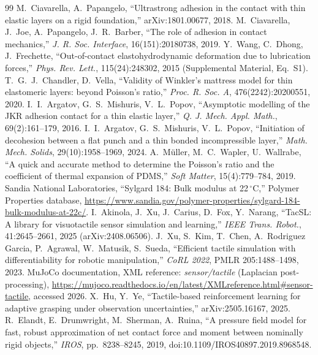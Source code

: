 \documentclass[10pt,twocolumn]{article}
\begin{document}
{\begin{thebibliography}{99}
 M.~Ciavarella, A.~Papangelo, ``Ultrastrong adhesion in the contact with thin elastic layers on a rigid foundation,'' arXiv:1801.00677, 2018.
 M.~Ciavarella, J.~Joe, A.~Papangelo, J.~R.~Barber, ``The role of adhesion in contact mechanics,'' \emph{J. R. Soc. Interface}, 16(151):20180738, 2019.
 Y.~Wang, C.~Dhong, J.~Frechette, ``Out-of-contact elastohydrodynamic deformation due to lubrication forces,'' \emph{Phys. Rev. Lett.}, 115(24):248302, 2015 (Supplemental Material, Eq.~S1).
 T.~G.~J.~Chandler, D.~Vella, ``Validity of Winkler's mattress model for thin elastomeric layers: beyond Poisson's ratio,'' \emph{Proc. R. Soc. A}, 476(2242):20200551, 2020.
 I.~I.~Argatov, G.~S.~Mishuris, V.~L.~Popov, ``Asymptotic modelling of the JKR adhesion contact for a thin elastic layer,'' \emph{Q. J. Mech. Appl. Math.}, 69(2):161--179, 2016.
 I.~I.~Argatov, G.~S.~Mishuris, V.~L.~Popov, ``Initiation of decohesion between a flat punch and a thin bonded incompressible layer,'' \emph{Math. Mech. Solids}, 29(10):1958--1969, 2024.
 A.~M\"uller, M.~C.~Wapler, U.~Wallrabe, ``A quick and accurate method to determine the Poisson's ratio and the coefficient of thermal expansion of PDMS,'' \emph{Soft Matter}, 15(4):779--784, 2019.
 Sandia National Laboratories, ``Sylgard 184: Bulk modulus at 22\,$^\circ$C,'' Polymer Properties database, \url{https://www.sandia.gov/polymer-properties/sylgard-184-bulk-modulus-at-22c/}.
 I.~Akinola, J.~Xu, J.~Carius, D.~Fox, Y.~Narang, ``TacSL: A library for visuotactile sensor simulation and learning,'' \emph{IEEE Trans. Robot.}, 41:2645--2661, 2025 (arXiv:2408.06506).
 J.~Xu, S.~Kim, T.~Chen, A.~Rodriguez Garcia, P.~Agrawal, W.~Matusik, S.~Sueda, ``Efficient tactile simulation with differentiability for robotic manipulation,'' \emph{CoRL 2022}, PMLR 205:1488--1498, 2023.
 MuJoCo documentation, XML reference: \emph{sensor/tactile} (Laplacian post-processing), \url{https://mujoco.readthedocs.io/en/latest/XMLreference.html#sensor-tactile}, accessed 2026.
 X.~Hu, Y.~Ye, ``Tactile-based reinforcement learning for adaptive grasping under observation uncertainties,'' arXiv:2505.16167, 2025.
 R.~Elandt, E.~Drumwright, M.~Sherman, A.~Ruina, ``A pressure field model for fast, robust approximation of net contact force and moment between nominally rigid objects,'' \emph{IROS}, pp.~8238--8245, 2019, doi:10.1109/IROS40897.2019.8968548.

\end{thebibliography}}
\end{document}
